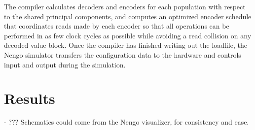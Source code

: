 \documentclass[english]{article}
\begin{document}
The compiler calculates decoders and encoders for each population with respect
to the shared principal components, and computes an optimized encoder schedule %
that coordinates reads made by each encoder so that all operations can be performed
in as few clock cycles as possible while avoiding a read collision on any decoded value block.
Once the compiler has finished writing out the loadfile, the Nengo simulator
transfers the configuration data to the hardware and controls input and output during the simulation.


\section{Results}
- ??? Schematics could come from the Nengo visualizer, for consistency and ease.



\end{document}
